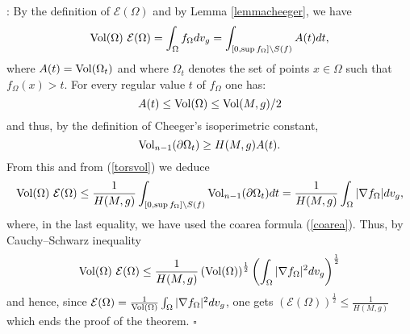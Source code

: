\documentclass[11pt, reqno]{amsart}
\theoremstyle{plain}
\begin{document}
:
By the definition of ${\mathcal E}(\Omega)$ and by Lemma \ref{lemmacheeger}, we have
\begin{equation}\label{torsvol}
{\rm Vol}(\Omega) \ {\mathcal E}(\Omega)=\int_\Omega f_{\Omega}dv_g=\int_{[0, \sup f_\Omega]\setminus S(f)}A(t)dt,
\end{equation}
where $A(t)={\rm Vol} (\Omega_t)$ and where $\Omega_t$  denotes the set of points $x\in\Omega$ such that $f_\Omega(x)>t$.
For every regular value  $t$ of $f_{\Omega}$ one has:
$$A(t)\leq {\rm Vol}(\Omega)\leq {\rm Vol}(M, g)/2$$
and thus, by the definition of Cheeger's isoperimetric constant,
$${\rm Vol}_{n-1}(\partial\Omega_t)\geq H(M, g)A(t).$$
From this and from (\ref{torsvol}) we deduce
$${\rm Vol}(\Omega) \ {\mathcal E}(\Omega)\leq \frac{1}{H(M, g)}\int_{[0, \sup f_\Omega]\setminus S(f)}{\rm Vol}_{n-1}(\partial\Omega_t)dt=
\frac{1}{H(M, g)}\int_\Omega|\nabla f_\Omega |dv_g,$$
where, in the last equality, we have used the coarea formula (\ref{coarea}).
Thus, by Cauchy--Schwarz inequality
$${\rm Vol}(\Omega) \ {\mathcal E}(\Omega)\leq\frac{1}{H(M, g)}\left({\rm Vol}(\Omega)\right)^{\frac{1}{2}}\left(\int_\Omega|\nabla f_\Omega |^2dv_g\right)^{\frac{1}{2}}$$
and hence, since  ${\mathcal E}(\Omega)=\frac{1}{{\rm Vol(\Omega)}}\int_\Omega|\nabla f_\Omega |^2dv_g$, one gets 
$\left({\mathcal E}(\Omega)\right)^{\frac{1}{2}}\leq\frac{1}{H(M, g)}$ which ends the proof of the theorem.
$\square$
\end{document}
